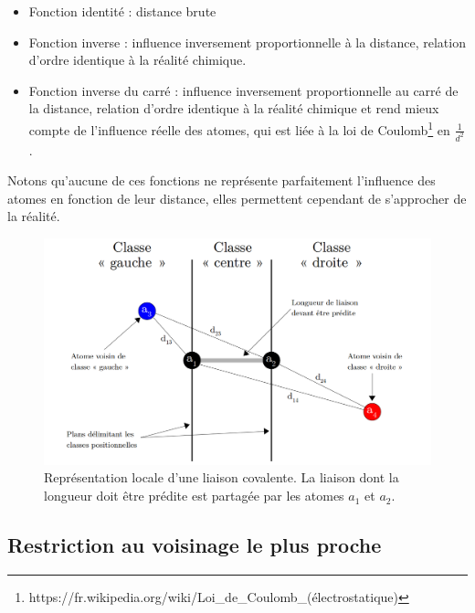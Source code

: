 \begin{itemize}
\item{Fonction identité : distance brute}
\item{Fonction inverse : influence inversement proportionnelle à la distance, relation d'ordre identique à la réalité chimique.}
\item{Fonction inverse du carré : influence inversement proportionnelle au carré de la distance, relation d'ordre identique à la réalité chimique et rend mieux compte de l'influence réelle des atomes, qui est liée à la loi de Coulomb\footnote{https://fr.wikipedia.org/wiki/Loi\_de\_Coulomb\_(électrostatique)} en $\frac{1}{d^2}$.}
\end{itemize}

\vspace{0.4cm}

\par Notons qu'aucune de ces fonctions ne représente parfaitement l'influence des atomes en fonction de leur distance, elles permettent cependant de s'approcher de la réalité.

\vspace{1cm}

\begin{figure}
	\centering
	\includegraphics[scale=0.32]{images/classes_pos_2.png}
	\caption{Représentation locale d'une liaison covalente. La liaison dont la longueur doit être prédite est partagée par les atomes $a_1$ et $a_2$.}
	\label{frepr_liaisons}
\end{figure}


\subsection{Restriction au voisinage le plus proche}


